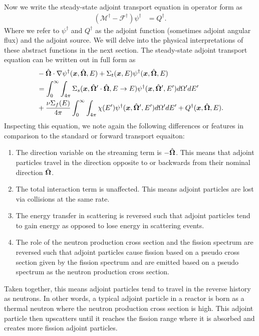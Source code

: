 Now we write the steady-state adjoint transport equation in operator form as
\begin{align}
  ( \mathcal{M}^\dagger - \mathcal{F}^\dagger ) \psi^\dagger &= Q^\dagger . \label{Eq:kinetics_operatorFormSteadyStateAdjointTransport}
\end{align}
Where we refer to $\psi^\dagger$ and $Q^\dagger$ as the adjoint function (sometimes adjoint angular flux) and the adjoint source. We will delve into the physical interpretations of these abstract functions in the next section. The steady-state adjoint transport equation can be written out in full form as
\begin{align}
  &-\hat{\mathbf{\Omega}} \cdot \nabla \psi^\dagger(\bm{x},\hat{\mathbf{\Omega}},E) + \Sigma_t(\bm{x},E) \psi^\dagger(\bm{x},\hat{\mathbf{\Omega}},E) \nonumber \\
  &= \int_0^\infty \int_{4\pi} \Sigma_s(\bm{x},\hat{\mathbf{\Omega}}' \cdot \hat{\mathbf{\Omega}} , E \rightarrow E ) \psi^\dagger(\bm{x},\hat{\mathbf{\Omega}}',E') d\Omega' dE' \nonumber \\
  &+ \frac{\nu\Sigma_f(E)}{4\pi} \int_0^\infty \int_{4\pi} \chi(E') \psi^\dagger(\bm{x},\hat{\mathbf{\Omega}}',E') d\Omega' dE' + Q^\dagger(\bm{x},\hat{\mathbf{\Omega}},E) .
\end{align}
Inspecting this equation, we note again the following differences or features in comparison to the standard or forward transport equaiton:
\begin{enumerate}
  \item The direction variable on the streaming term is $-\hat{\mathbf{\Omega}}$. This means that adjoint particles travel in the direction opposite to or backwards from their nominal direction $\hat{\mathbf{\Omega}}$.
  \item The total interaction term is unaffected. This means adjoint particles are lost via collisions at the same rate.
  \item The energy transfer in scattering is reversed such that adjoint particles tend to gain energy as opposed to lose energy in scattering events.
  \item The role of the neutron production cross section and the fission spectrum are reversed such that adjoint particles cause fission based on a pseudo cross section given by the fission spectrum and are emitted based on a pseudo spectrum as the neutron production cross section.
\end{enumerate}
Taken together, this means adjoint particles tend to travel in the reverse history as neutrons. In other words, a typical adjoint particle in a reactor is born as a thermal neutron where the neutron production cross section is high. This adjoint particle then upscatters until it reaches the fission range where it is absorbed and creates more fission adjoint particles.

